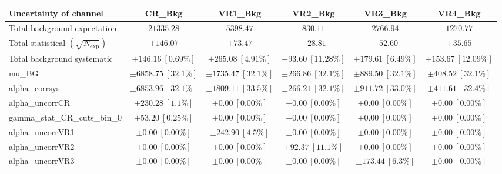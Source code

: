 
\begin{table}
\centering
\small
\begin{tabular*}{\textwidth}{@{\extracolsep{\fill}}lccccc}
\toprule
\textbf{Uncertainty of channel}                                    & CR\_Bkg            & VR1\_Bkg            & VR2\_Bkg            & VR3\_Bkg            & VR4\_Bkg            \\
\midrule
Total background expectation             &  $21335.28$        &  $5398.47$        &  $830.11$        &  $2766.94$        &  $1270.77$       \\
\midrule
Total statistical $(\sqrt{N_{\mathrm{exp}}})$              & $\pm 146.07$        & $\pm 73.47$        & $\pm 28.81$        & $\pm 52.60$        & $\pm 35.65$       \\
Total background systematic               & $\pm 146.16\ [0.69\%] $        & $\pm 265.08\ [4.91\%] $        & $\pm 93.60\ [11.28\%] $        & $\pm 179.61\ [6.49\%] $        & $\pm 153.67\ [12.09\%] $             \\
\midrule
mu\_BG         & $\pm 6858.75\ [32.1\%] $          & $\pm 1735.47\ [32.1\%] $          & $\pm 266.86\ [32.1\%] $          & $\pm 889.50\ [32.1\%] $          & $\pm 408.52\ [32.1\%] $       \\
alpha\_corrsys         & $\pm 6853.96\ [32.1\%] $          & $\pm 1809.11\ [33.5\%] $          & $\pm 266.21\ [32.1\%] $          & $\pm 911.72\ [33.0\%] $          & $\pm 411.61\ [32.4\%] $       \\
alpha\_uncorrCR         & $\pm 230.28\ [1.1\%] $          & $\pm 0.00\ [0.00\%] $          & $\pm 0.00\ [0.00\%] $          & $\pm 0.00\ [0.00\%] $          & $\pm 0.00\ [0.00\%] $       \\
gamma\_stat\_CR\_cuts\_bin\_0         & $\pm 53.20\ [0.25\%] $          & $\pm 0.00\ [0.00\%] $          & $\pm 0.00\ [0.00\%] $          & $\pm 0.00\ [0.00\%] $          & $\pm 0.00\ [0.00\%] $       \\
alpha\_uncorrVR1         & $\pm 0.00\ [0.00\%] $          & $\pm 242.90\ [4.5\%] $          & $\pm 0.00\ [0.00\%] $          & $\pm 0.00\ [0.00\%] $          & $\pm 0.00\ [0.00\%] $       \\
alpha\_uncorrVR2         & $\pm 0.00\ [0.00\%] $          & $\pm 0.00\ [0.00\%] $          & $\pm 92.37\ [11.1\%] $          & $\pm 0.00\ [0.00\%] $          & $\pm 0.00\ [0.00\%] $       \\
alpha\_uncorrVR3         & $\pm 0.00\ [0.00\%] $          & $\pm 0.00\ [0.00\%] $          & $\pm 0.00\ [0.00\%] $          & $\pm 173.44\ [6.3\%] $          & $\pm 0.00\ [0.00\%] $       \\

\end{tabular*}
\end{table}
